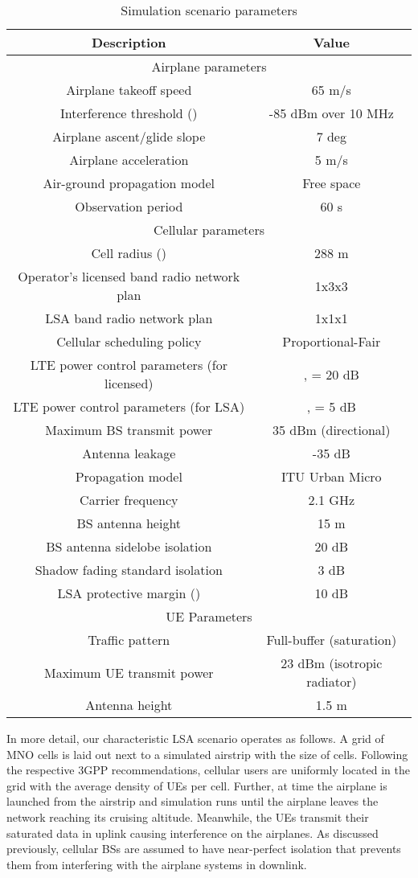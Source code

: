 \documentclass[journal]{IEEEtran}
\begin{document}
\begin{table}[!ht]
\centering
\caption{Simulation scenario parameters}
{\scriptsize
\begin{tabular}{|c|c|}
\hline 
Description & Value\tabularnewline
\hline 
\hline 
\multicolumn{2}{|c|}{Airplane parameters}\tabularnewline
\hline 
Airplane takeoff speed & 65 m/s\tabularnewline
\hline 
Interference threshold () & -85 dBm over 10 MHz\tabularnewline
\hline 
Airplane ascent/glide slope & 7 deg\tabularnewline
\hline 
Airplane acceleration & 5 m/s\tabularnewline
\hline 
Air-ground propagation model & Free space\tabularnewline
\hline 
Observation period & 60 s\tabularnewline
\hline 
\multicolumn{2}{|c|}{Cellular parameters}\tabularnewline
\hline 
Cell radius () & 288 m\tabularnewline
\hline 
Operator's licensed band radio network plan & 1x3x3\tabularnewline
\hline 
LSA band radio network plan & 1x1x1\tabularnewline
\hline 
Cellular scheduling policy & Proportional-Fair\tabularnewline
\hline 
LTE power control parameters (for licensed) & ,  = 20 dB\tabularnewline
\hline 
LTE power control parameters (for LSA) & ,  = 5 dB\tabularnewline
\hline 
Maximum BS transmit power & 35 dBm (directional)\tabularnewline
\hline 
Antenna leakage & -35 dB\tabularnewline
\hline 
Propagation model & ITU Urban Micro\tabularnewline
\hline 
Carrier frequency & 2.1 GHz\tabularnewline
\hline 
BS antenna height & 15 m\tabularnewline
\hline 
BS antenna sidelobe isolation & 20 dB\tabularnewline
\hline 
Shadow fading standard isolation & 3 dB\tabularnewline
\hline 
LSA protective margin () & 10 dB\tabularnewline
\hline 
\multicolumn{2}{|c|}{UE Parameters}\tabularnewline
\hline 
Traffic pattern & Full-buffer (saturation)\tabularnewline
\hline 
Maximum UE transmit power & 23 dBm (isotropic radiator)\tabularnewline
\hline 
Antenna height & 1.5 m\tabularnewline
\hline 
\end{tabular}}
\vspace{-0.5cm}
\end{table}

In more detail, our characteristic LSA scenario operates as follows. A grid of MNO cells is laid out next to a simulated airstrip with the size of  cells. Following the respective 3GPP recommendations, cellular users are uniformly located in the grid with the average density of  UEs per cell. Further, at time  the airplane is launched from the airstrip and simulation runs until the airplane leaves the network reaching its cruising altitude. Meanwhile, the UEs transmit their saturated data in uplink causing interference on the airplanes. As discussed previously, cellular BSs are assumed to have near-perfect isolation that prevents them from interfering with the airplane systems in downlink.
\end{document}
